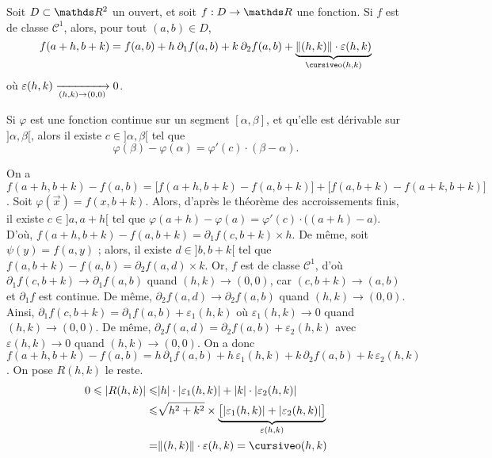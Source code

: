 \begin{thm}
	Soit $D \subset \R^2$ un ouvert, et soit $f : D \to \R$ une fonction. Si $f$ est de classe $\mathcal{C}^1$, alors, pour tout $(a,b) \in D$, \[
		f(a+h,b+k) = f(a,b) + h \:\partial_1 f(a,b) + k\: \partial_2 f(a,b) + \underbrace{\|(h,k)\| \cdot  \varepsilon(h,k)}_{\po(h,k)}
	\]où $\varepsilon(h,k) \xrightarrow[(h,k) \to (0,0)]{} 0$.
\end{thm}

\begin{rap}
	Si $\varphi$ est une fonction continue sur un segment $[\alpha, \beta]$, et qu'elle est dérivable sur $]\alpha,\beta[$, alors il existe $c \in {]\alpha,\beta[}$ tel que \[
		\varphi(\beta) - \varphi(\alpha) = \varphi'(c) \cdot (\beta - \alpha)
	.\]
\end{rap}

\begin{prv}
	On a $f(a+h, b + k) - f(a,b) = \big[f(a+h,b+k) - f(a,b+k)\big] + \big[f(a,b+k) - f(a + k,b+k)\big]$.
	Soit $\varphi(\vec{x})  = f(x,b+k)$. Alors, d'après le théorème des accroissements finis, il existe $c \in {]a,a+h[}$ tel que $\varphi(a+h) - \varphi(a) = \varphi'(c) \cdot \big((a+h) - a\big)$.
	D'où, $f(a+h, b+k) - f(a,b+k) = \partial_1 f(c,b+k) \times h$.
	De même, soit $\psi(y) = f(a,y)$ ; alors, il existe $d \in {]b,b+k[}$ tel que $f(a,b+k) - f(a,b) = \partial_2 f(a,d) \times k$.
	Or, $f$ est de classe $\mathcal{C}^1$, d'où $\partial_1 f(c,b+k) \to \partial_1 f(a, b)$ quand $(h,k) \to (0,0)$, car $(c,b+k) \to (a,b)$ et $\partial_1 f$ est continue.
	De même, $\partial_2 f(a,d) \to \partial_2 f(a,b)$ quand $(h,k) \to (0,0)$.
	Ainsi, $\partial_1 f(c,b+k) = \partial_1 f(a,b) + \varepsilon_1(h,k)$ où $\varepsilon_1(h,k) \to 0$ quand $(h,k) \to (0,0)$.
	De même, $\partial_2 f(a,d) = \partial_2 f(a,b) + \varepsilon_2(h,k)$ avec $\varepsilon(h,k) \to 0$ quand $(h,k) \to (0,0)$.
	On a donc $f(a+h,b+k) - f(a,b) = h\, \partial_1 f(a,b) + h\, \varepsilon_1(h,k) + k\, \partial_2 f(a,b) + k\, \varepsilon_2(h,k)$.
	On pose $R(h,k)$ le reste.
	\begin{align*}
		0 \le |R(h,k)| \le& |h| \cdot |\varepsilon_1(h,k)| + |k|\cdot |\varepsilon_2(h,k)|\\
		\le& \sqrt{h^2 + k^2} \times \underbrace{\big[ |\varepsilon_1(h,k)| + |\varepsilon_2(h,k)| \big]}_{\varepsilon(h,k)}\\
		=& \|(h,k)\| \cdot \varepsilon(h,k) = \po(h,k)
	\end{align*}
\end{prv}

